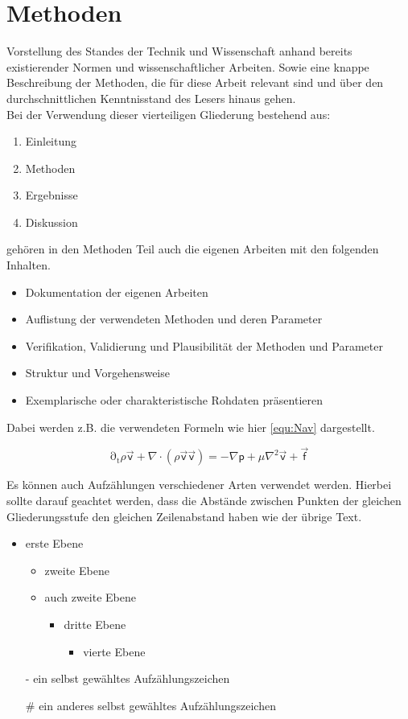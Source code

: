 \chapter{Methoden}
\label{cpt:Methoden}

Vorstellung des Standes der Technik und Wissenschaft anhand bereits existierender Normen und wissenschaftlicher Arbeiten. Sowie eine knappe Beschreibung der Methoden, die für diese Arbeit relevant sind und über den durchschnittlichen Kenntnisstand des Lesers hinaus gehen. \\

Bei der Verwendung dieser vierteiligen Gliederung bestehend aus:
\begin{enumerate}[itemsep=-6pt]
	\item Einleitung
	\item Methoden
	\item Ergebnisse
	\item Diskussion
\end{enumerate}
gehören in den Methoden Teil auch die eigenen Arbeiten mit den folgenden Inhalten.
\begin{itemize}[itemsep=-6pt]
	\item Dokumentation der eigenen Arbeiten
	\item Auflistung der verwendeten Methoden und deren Parameter
	\item Verifikation, Validierung und Plausibilität der Methoden und Parameter
	\item Struktur und Vorgehensweise
	\item Exemplarische oder charakteristische Rohdaten präsentieren
\end{itemize}

Dabei werden z.B. die verwendeten Formeln wie hier \autoref{equ:Nav} dargestellt.

\begin{equation}
	\label{equ:Nav}
	\mathrm{\partial_t} \rho \vec{\mathsf{v}} + \nabla \cdot (\rho \vec{\mathsf{v}} \vec{\mathsf{v}}) = -\nabla \mathsf{p} + \mu \nabla^2 \vec{\mathsf{v}} + \vec{\mathsf{f}} 
\end{equation}

Es können auch Aufzählungen verschiedener Arten verwendet werden. Hierbei sollte darauf geachtet werden, dass die Abstände zwischen Punkten der gleichen Gliederungsstufe den gleichen Zeilenabstand haben wie der übrige Text. 

\begin{itemize}[itemsep=-6pt]
	\item erste Ebene
	\begin{itemize}[itemsep=-6pt]
		\item zweite Ebene
		\item auch zweite Ebene
		\begin{itemize}[itemsep=-6pt]
			\item dritte Ebene
			\begin{itemize}[itemsep=-6pt]
				\item vierte Ebene
			\end{itemize}
		\end{itemize}
	\end{itemize}
\end{itemize}

\begin{itemize}[itemsep=-6pt]
	\item[-] ein selbst gewähltes Aufzählungszeichen
	\item[\#] ein anderes selbst gewähltes Aufzählungszeichen
\end{itemize}

